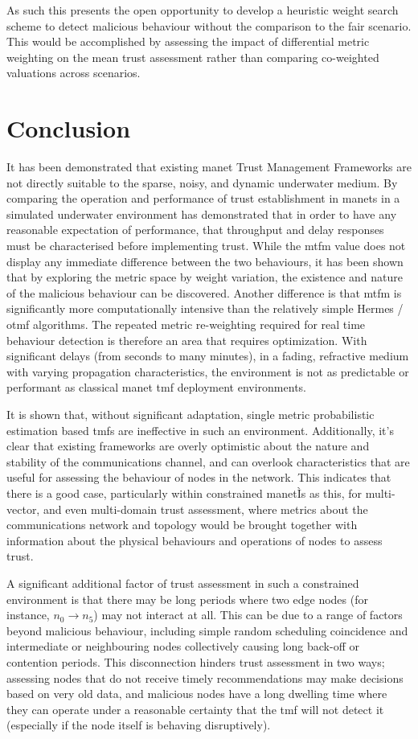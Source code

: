 As such this presents the open opportunity to develop a heuristic weight search scheme to detect malicious behaviour without the comparison to the fair scenario.
This would be accomplished by assessing the impact of differential metric weighting on the mean trust assessment rather than comparing co-weighted valuations across scenarios.

\section{Conclusion}
It has been demonstrated that existing \gls{manet} Trust Management Frameworks are not directly suitable to the sparse, noisy, and dynamic underwater medium.
By comparing the operation and performance of trust establishment in \glspl{manet} in a simulated underwater environment has demonstrated that in order to have any reasonable expectation of performance, that throughput and delay responses must be characterised before implementing trust. 
While the \gls{mtfm} value does not display any immediate difference between the two behaviours, it has been shown that by exploring the metric space by weight variation, the existence and nature of the malicious behaviour can be discovered.
Another difference is that \gls{mtfm} is significantly more computationally intensive than the relatively simple Hermes / \gls{otmf} algorithms.
The repeated metric re-weighting required for real time behaviour detection is therefore an area that requires optimization.
With significant delays (from seconds to many minutes), in a fading, refractive medium with varying propagation characteristics, the environment is not as predictable or performant as classical \gls{manet} \gls{tmf} deployment environments.

It is shown that, without significant adaptation, single metric probabilistic estimation based \glspl{tmf} are ineffective in such an environment.
Additionally, it's clear that existing frameworks are overly optimistic about the nature and stability of the communications channel, and can overlook characteristics that are useful for assessing the behaviour of nodes in the network. 
This indicates that there is a good case, particularly within constrained \gls{manet}Ìs as this, for multi-vector, and even multi-domain trust assessment, where metrics about the communications network and topology would be brought together with information about the physical behaviours and operations of nodes to assess trust.

A significant additional factor of trust assessment in such a constrained environment is that there may be long periods where two edge nodes (for instance, $n_0 \to n_5$) may not interact at all. 
This can be due to a range of factors beyond malicious behaviour, including simple random scheduling coincidence and intermediate or neighbouring nodes collectively causing long back-off or contention periods.
This disconnection hinders trust assessment in two ways; assessing nodes that do not receive timely recommendations may make decisions based on very old data, and malicious nodes have a long dwelling time where they can operate under a reasonable certainty that the \gls{tmf} will not detect it (especially if the node itself is behaving disruptively).

